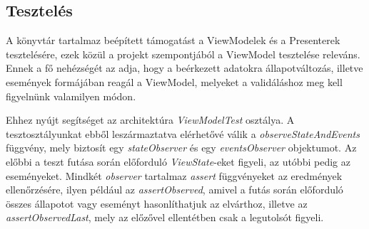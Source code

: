 \subsection{Tesztelés}
A könyvtár tartalmaz beépített támogatást a ViewModelek és a Presenterek tesztelésére, ezek közül a projekt szempontjából a ViewModel tesztelése releváns. Ennek a fő nehézségét az adja, hogy a beérkezett adatokra állapotváltozás, illetve események formájában reagál a ViewModel, melyeket a validáláshoz meg kell figyelnünk valamilyen módon. \cite{RainbowcakeTest}

Ehhez nyújt segítséget az architektúra \emph{ViewModelTest} osztálya. A tesztosztályunkat ebből leszármaztatva elérhetővé válik a \emph{observeStateAndEvents} függvény, mely biztosít egy \emph{stateObserver} és egy \emph{eventsObserver} objektumot. Az előbbi a teszt futása során előforduló \emph{ViewState}-eket figyeli, az utóbbi pedig az eseményeket. Mindkét \emph{observer} tartalmaz \emph{assert} függvényeket az eredmények ellenőrzésére, ilyen például az \emph{assertObserved}, amivel a futás során előforduló összes állapotot vagy eseményt hasonlíthatjuk az elvárthoz, illetve az \emph{assertObservedLast}, mely az előzővel ellentétben csak a legutolsót figyeli.
